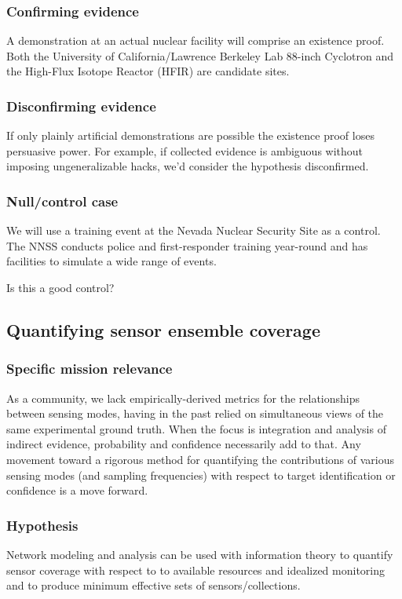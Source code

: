 \documentclass{article} %
\begin{document}
\subsubsection{Confirming evidence}
A demonstration at an actual nuclear facility will comprise an existence proof. Both the University of California/Lawrence Berkeley Lab 88-inch Cyclotron and the High-Flux Isotope Reactor (HFIR) are candidate sites.

\subsubsection{Disconfirming evidence}
If only plainly artificial demonstrations are possible the existence proof loses persuasive power. For example, if collected evidence is ambiguous without imposing ungeneralizable hacks, we'd consider the hypothesis disconfirmed.

\subsubsection{Null/control case}
We will use a training event at the Nevada Nuclear Security Site as a control. The NNSS conducts police and first-responder training year-round and has facilities to simulate a wide range of events. 

{\color {red} Is this a good control?}

\pagebreak
\subsection{Quantifying sensor ensemble coverage}
\subsubsection{Specific mission relevance}
As a community, we lack empirically-derived metrics for the relationships between sensing modes, having in the past relied on simultaneous views of the same experimental ground truth. When the focus is integration and analysis of indirect evidence, probability and confidence necessarily add to that. Any movement toward a rigorous method for quantifying the contributions of various sensing modes (and sampling frequencies) with respect to target identification or confidence is a move forward.

\subsubsection{Hypothesis}
Network modeling and analysis can be used with information theory to quantify sensor coverage with respect to to available resources and idealized monitoring and to produce minimum effective sets of sensors/collections.
\end{document}
